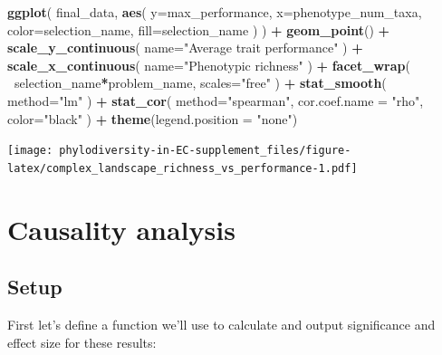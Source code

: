 \documentclass[]{book}
\newenvironment{Shaded}{\begin{snugshade}}{\end{snugshade}}
\newcommand{\DataTypeTok}[1]{\textcolor[rgb]{0.13,0.29,0.53}{#1}}
\newcommand{\KeywordTok}[1]{\textcolor[rgb]{0.13,0.29,0.53}{\textbf{#1}}}
\newcommand{\NormalTok}[1]{#1}
\newcommand{\OperatorTok}[1]{\textcolor[rgb]{0.81,0.36,0.00}{\textbf{#1}}}
\newcommand{\StringTok}[1]{\textcolor[rgb]{0.31,0.60,0.02}{#1}}
\begin{document}
\begin{Shaded}
\begin{Highlighting}[]
\KeywordTok{ggplot}\NormalTok{(}
\NormalTok{    final_data,}
    \KeywordTok{aes}\NormalTok{(}
        \DataTypeTok{y=}\NormalTok{max_performance,}
        \DataTypeTok{x=}\NormalTok{phenotype_num_taxa,}
        \DataTypeTok{color=}\NormalTok{selection_name,}
        \DataTypeTok{fill=}\NormalTok{selection_name}
\NormalTok{    )}
\NormalTok{  ) }\OperatorTok{+}
\StringTok{  }\KeywordTok{geom_point}\NormalTok{() }\OperatorTok{+}
\StringTok{    }\KeywordTok{scale_y_continuous}\NormalTok{(}
        \DataTypeTok{name=}\StringTok{"Average trait performance"}
\NormalTok{  ) }\OperatorTok{+}
\StringTok{  }\KeywordTok{scale_x_continuous}\NormalTok{(}
        \DataTypeTok{name=}\StringTok{"Phenotypic richness"}
\NormalTok{  ) }\OperatorTok{+}\StringTok{ }
\StringTok{  }\KeywordTok{facet_wrap}\NormalTok{(}
      \OperatorTok{~}\NormalTok{selection_name}\OperatorTok{*}\NormalTok{problem_name, }\DataTypeTok{scales=}\StringTok{"free"}
\NormalTok{  ) }\OperatorTok{+}\StringTok{ }
\StringTok{  }\KeywordTok{stat_smooth}\NormalTok{(}
    \DataTypeTok{method=}\StringTok{"lm"}
\NormalTok{  ) }\OperatorTok{+}\StringTok{ }
\StringTok{  }\KeywordTok{stat_cor}\NormalTok{(}
    \DataTypeTok{method=}\StringTok{"spearman"}\NormalTok{, }\DataTypeTok{cor.coef.name =} \StringTok{"rho"}\NormalTok{, }\DataTypeTok{color=}\StringTok{"black"}
\NormalTok{  ) }\OperatorTok{+}
\StringTok{  }\KeywordTok{theme}\NormalTok{(}\DataTypeTok{legend.position =} \StringTok{"none"}\NormalTok{)}
\end{Highlighting}
\end{Shaded}

\texttt{[image: phylodiversity-in-EC-supplement\_files/figure-latex/complex\_landscape\_richness\_vs\_performance-1.pdf]}

\hypertarget{causality-analysis-1}{%
\section{Causality analysis}\label{causality-analysis-1}}

\hypertarget{setup-3}{%
\subsection{Setup}\label{setup-3}}

First let's define a function we'll use to calculate and output significance and effect size for these results:
\end{document}
